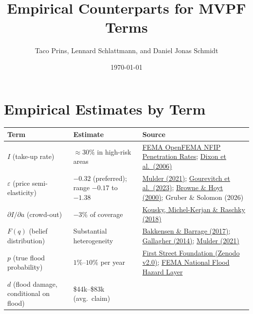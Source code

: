 \documentclass[12pt]{article}
\title{Empirical Counterparts for MVPF Terms}
\author{Taco Prins, Lennard Schlattmann, and Daniel Jonas Schmidt}
\date{\today}
\begin{document}
\maketitle

\section*{Empirical Estimates by Term}

\begin{table}[h]
\centering
\small
\renewcommand{\arraystretch}{1}
\begin{tabularx}{\linewidth}{p{4.6cm}p{4.3cm}X}
\toprule
\textbf{Term} & \textbf{Estimate} & \textbf{Source} \\
\midrule
$I$ (take-up rate)
    & $\approx 30\%$ in high-risk areas
    & \href{https://www.fema.gov/openfema-data-page/nfip-residential-penetration-rates-v1}{FEMA OpenFEMA NFIP Penetration Rates}; \href{https://www.rand.org/content/dam/rand/pubs/technical_reports/2006/RAND_TR300.pdf}{Dixon et al.\ (2006)} \\
$\varepsilon$ (price semi-elasticity)
    & $-0.32$ (preferred); range $-0.17$ to $-1.38$
    & \href{https://faculty.wharton.upenn.edu/wp-content/uploads/2017/07/MismeasuringRisk_Mulder2021.pdf}{Mulder (2021)};
      \href{https://journalofcrr.com/research/03-07-gourevitch-et-al/}{Gourevitch et al.\ (2023)};
      \href{https://link.springer.com/article/10.1023/A:1007823631497}{Browne \& Hoyt (2000)};
      Gruber \& Solomon (2026) \\
$\partial I / \partial a$ (crowd-out)
    & $-3\%$ of coverage
    & \href{https://www.sciencedirect.com/science/article/abs/pii/S0095069617303479}{Kousky, Michel-Kerjan \& Raschky (2018)} \\
$F(q)$ (belief distribution)
    & Substantial heterogeneity
    & \href{https://www.nber.org/system/files/working_papers/w23854/w23854.pdf}{Bakkensen \& Barrage (2017)};
      \href{https://www.aeaweb.org/articles?id=10.1257/app.6.3.206}{Gallagher (2014)};
      \href{https://faculty.wharton.upenn.edu/wp-content/uploads/2017/07/MismeasuringRisk_Mulder2021.pdf}{Mulder (2021)} \\
$p$ (true flood probability)
    & $1\%$--$10\%$ per year
    & \href{https://zenodo.org/records/6459076}{First Street Foundation (Zenodo v2.0)};
      \href{https://www.fema.gov/flood-maps/national-flood-hazard-layer}{FEMA National Flood Hazard Layer} \\
$d$ (flood damage, conditional on flood)
    & \$44k--\$83k (avg.\ claim)

\end{tabularx}
\end{table}
\end{document}
